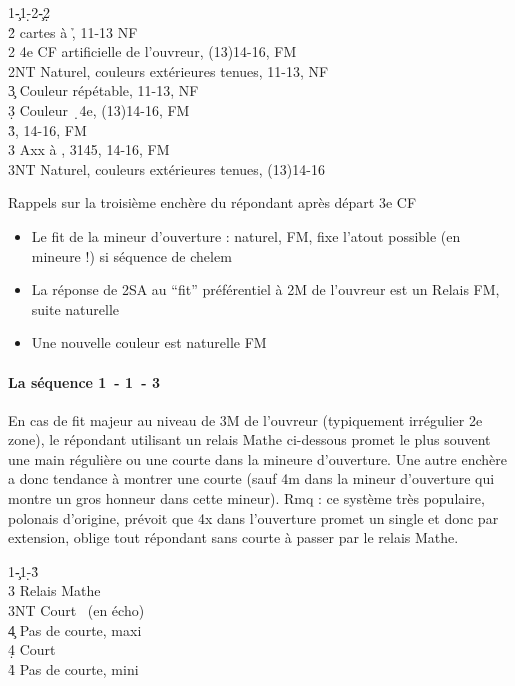 \documentclass[a4paper]{article}
\begin{document}
\begin{bidtable}
1\c-1\d-2\c-2\d\+\\
2\h {} cartes à \h , 11-13 NF\\
2\s \> 4e CF artificielle de l'ouvreur, (13)14-16, FM\\
2NT \> Naturel, couleurs extérieures tenues, 11-13, NF\\
3\c \> Couleur répétable, 11-13, NF\\
3\d \> Couleur \d\ 4e, (13)14-16, FM\\
3\h {}, 14-16, FM\\
3\s \> Axx à \s , 3145, 14-16, FM\\
3NT \> Naturel, couleurs extérieures tenues, (13)14-16\-
\end{bidtable}

Rappels sur la troisième enchère du répondant après départ 3e CF

\begin{itemize}
\item Le fit de la mineur d'ouverture : naturel, FM, fixe l'atout possible (en mineure !) si séquence de chelem

\item La réponse de 2SA au ``fit'' préférentiel à 2M de l'ouvreur est un Relais FM, suite naturelle

\item Une nouvelle couleur est naturelle FM

\end{itemize}

\paragraph{La séquence 1\pdfc\ - 1\pdfd\ - 3\pdfh}

En cas de fit majeur au niveau de 3M de l'ouvreur (typiquement irrégulier 2e zone), le répondant utilisant un relais Mathe ci-dessous promet le plus souvent une main régulière ou une courte dans la mineure d'ouverture. Une autre enchère a donc tendance à montrer une courte (sauf 4m dans la mineur d'ouverture qui montre un gros 
honneur dans cette mineur). Rmq : ce système très populaire, polonais d'origine, prévoit que 4x dans l'ouverture promet un single et donc par extension, oblige tout répondant sans courte à passer par le relais Mathe.

\begin{bidtable}
1\c-1\d-3\h\+\\
3\s \> Relais Mathe\+\\
3NT \> Court \s\ (en écho)\\
4\c \> Pas de courte, maxi\\
4\d \> Court \d \\
4\h \> Pas de courte, mini\-\-
\end{bidtable}
\end{document}
